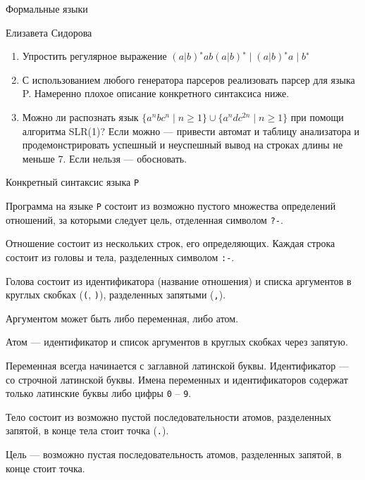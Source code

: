 \documentclass[12pt]{article}
\begin{document}
\begin{center}
{\LARGE Формальные языки}

\bigskip

{\Large Елизавета Сидорова}
\end{center} 

\bigskip

\begin{enumerate}
  \item Упростить регулярное выражение $(a|b)^∗ a b (a|b)^∗ \mid (a|b)^∗ a \mid b^∗$
  \item С использованием любого генератора парсеров реализовать парсер для языка P. Намеренно плохое описание конкретного синтаксиса ниже.
  \item Можно ли распознать язык $\{ a^n b c^n \mid n \geq 1 \} \cup \{ a^n d c^{2n} \mid n \geq 1 \}$ при помощи алгоритма SLR(1)? Если можно --- привести автомат и таблицу анализатора и продемонстрировать успешный и неуспешный вывод на строках длины не меньше 7. Если нельзя --- обосновать.
\end{enumerate}

\begin{center}
    \Large{Конкретный синтаксис языка \verb!P!}
\end{center}

Программа на языке \verb!P! состоит из возможно пустого множества определений отношений, за которыми следует цель, отделенная символом \verb!?-!.

Отношение состоит из нескольких строк, его определяющих. 
Каждая строка состоит из головы и тела, разделенных символом \verb!:-!. 

Голова состоит из идентификатора (название отношения) и списка аргументов в круглых скобках (\verb!(!, \verb!)!), разделенных запятыми (\verb!,!). 

Аргументом может быть либо переменная, либо атом. 

Атом --- идентификатор и список аргументов в круглых скобках через запятую. 

Переменная всегда начинается с заглавной латинской буквы. Идентификатор --- со строчной латинской буквы.
Имена переменных и идентификаторов содержат только латинские буквы либо цифры \verb!0! -- \verb!9!.

Тело состоит из возможно пустой последовательности атомов, разделенных запятой, в конце тела стоит точка (\verb!.!).

Цель --- возможно пустая последовательность атомов, разделенных запятой, в конце стоит точка. 
\end{document}
